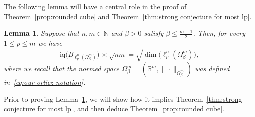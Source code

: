 \documentclass[11pt,reqno]{amsart}
\renewcommand{\le}{\leqslant}
\newcommand{\R}{\mathbb R}
\newtheorem{lemma}[theorem]{Lemma}
\theoremstyle{remark}
\newcommand{\iq}{\mathrm{iq}}
\newcommand{\N}{\mathbb N}
\renewcommand{\1}{\mathbf 1}
\begin{document}
The following lemma will have a central role in the proof of Theorem~\ref{prop:rounded cube}  and  Theorem~\ref{thm:strong conjecture for most lp}.

\begin{lemma}\label{lem:direct sum of orlicz} Suppose that $n,m\in \N$ and $\beta>0$ satisfy $\beta\le \frac{m-1}{2}$. Then, for every $1\le p\le m$ we have
$$
\iq\big(B_{\ell_p^n(\Omega^m_\beta)}\big)\asymp \sqrt{nm}=\sqrt{\dim\big(\ell_p^n(\Omega^m_\beta)\big)},
$$
where we recall that the normed space $\Omega_\beta^m=(\R^m,\|\cdot\|_{\Omega_\beta^m})$ was defined in~\eqref{eq:our orlicz notation}.
\end{lemma}

Prior to proving Lemma~\ref{lem:direct sum of orlicz}, we will  show how it implies Theorem~\ref{thm:strong conjecture for most lp}, and then deduce Theorem~\ref{prop:rounded cube}.
\end{document}
